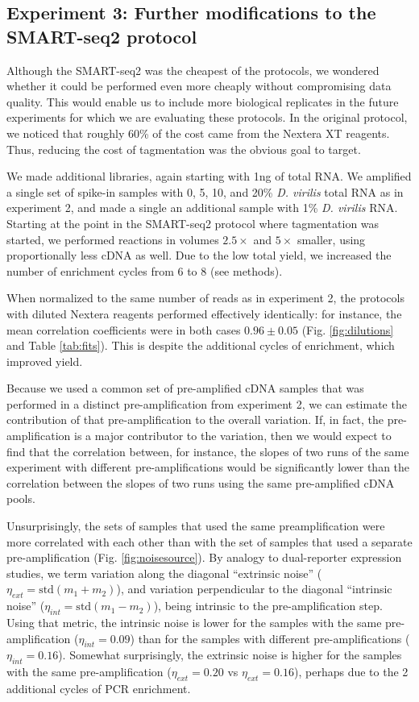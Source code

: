 \subsection{Experiment 3: Further modifications to the SMART-seq2 protocol}

Although the SMART-seq2 was the cheapest of the protocols, we wondered whether it could be performed even more cheaply without compromising data quality.  This would enable us to include more biological replicates in the future experiments for which we are evaluating these protocols.  In the original protocol, we noticed that roughly 60\% of the cost came from the Nextera XT reagents.  Thus, reducing the cost of tagmentation was the obvious goal to target.  

We made additional libraries, again starting with 1ng of total RNA.  We amplified a single set of spike-in samples with 0, 5, 10, and 20\% {\em D. virilis} total RNA as in experiment 2, and made a single an additional sample with 1\% {\em D. virilis} RNA. Starting at the point in the SMART-seq2 protocol where tagmentation was started, we performed reactions in volumes $2.5\times$ and $5\times$ smaller, using proportionally less cDNA as well.  Due to the low total yield, we increased the number of enrichment cycles from 6 to 8 (see methods). 

When normalized to the same number of reads as in experiment 2, the protocols with diluted Nextera reagents performed effectively identically: for instance, the mean correlation coefficients were in both cases $0.96 \pm 0.05$ (Fig. \ref{fig:dilutions} and Table \ref{tab:fits}).  This is despite the additional cycles of enrichment, which improved yield.

Because we used a common set of pre-amplified cDNA samples that was performed in a distinct pre-amplification from experiment 2, we can estimate the contribution of that pre-amplification to the overall variation. If, in fact, the pre-amplification is a major contributor to the variation, then we would expect to find that the correlation between, for instance, the slopes of two runs of the same experiment with different pre-amplifications would be significantly lower than the correlation between the slopes of two runs using the same pre-amplified cDNA pools. 

Unsurprisingly, the sets of samples that used the same preamplification were more correlated with each other than with the set of samples that used a separate pre-amplification (Fig. \ref{fig:noisesource}).  By analogy to dual-reporter expression studies\cite{Elowitz:2002hb}, we term variation along the diagonal ``extrinsic noise'' ($\eta_{ext} = \mbox{std}(m_1 + m_2)$), and variation perpendicular to the diagonal ``intrinsic noise'' ($\eta_{int} = \mbox{std}(m_1 - m_2)$), being intrinsic to the pre-amplification step.  Using that metric, the intrinsic noise is lower for the samples with the same pre-amplification ($\eta_{int} =0.09$) than for the samples with different pre-amplifications ($\eta_{int} =0.16$). Somewhat surprisingly, the extrinsic noise is higher for the samples with the same pre-amplification ($\eta_{ext} = 0.20$ vs $\eta_{ext} = 0.16$), perhaps due to the 2 additional cycles of PCR enrichment.